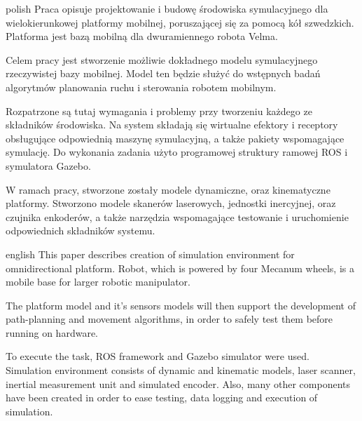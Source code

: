  \begin{abstractpage}
	\begin{abstractsection}{polish}
		Praca opisuje projektowanie i budowę środowiska symulacyjnego dla wielokierunkowej platformy mobilnej, poruszającej się za pomocą kół szwedzkich.
		Platforma jest bazą mobilną dla dwuramiennego robota Velma. 
		
		Celem pracy jest stworzenie możliwie dokładnego modelu symulacyjnego rzeczywistej bazy mobilnej.
		Model ten będzie służyć do wstępnych badań algorytmów planowania ruchu i sterowania robotem mobilnym.

		Rozpatrzone są tutaj wymagania i problemy przy tworzeniu każdego ze składników środowiska.
		Na system składają się wirtualne efektory i receptory obsługujące odpowiednią maszynę symulacyjną, a także pakiety wspomagające symulację.
		Do wykonania zadania użyto programowej struktury ramowej ROS i symulatora Gazebo.
		
		W ramach pracy, stworzone zostały modele dynamiczne, oraz kinematyczne platformy.
		Stworzono modele skanerów laserowych, jednostki inercyjnej, oraz czujnika enkoderów, a także narzędzia wspomagające testowanie i uruchomienie odpowiednich składników systemu.
	\end{abstractsection}

	\begin{abstractsection}{english}
		This paper describes creation of simulation environment for omnidirectional platform.
		Robot, which is powered by four Mecanum wheels, is a mobile base for larger robotic manipulator.
		
		The platform model and it's sensors models will then support the development of path-planning and movement algorithms, in order to safely test them before running on
		hardware.
		
		To execute the task, ROS framework and Gazebo simulator were used.
		Simulation environment consists of dynamic and kinematic models, laser scanner, inertial measurement unit and simulated encoder. 
		Also, many other components have been created in order to ease testing, data logging and execution of simulation.
	\end{abstractsection}
\end{abstractpage}
